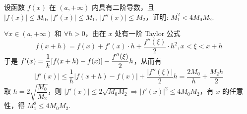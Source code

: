 \begin{example}
    设函数 $f(x)$ 在 $(a,+\infty)$ 内具有二阶导数，且 $|f(x)|\leqslant M_0,~|f'(x)|\leqslant M_1,~|f''(x)|\leqslant M_2$，证明: $M_1^2< 4M_0M_2.$
\end{example}
\begin{solution}
    $\forall x\in(a,+\infty)$ 和 $\forall h>0$，由在 $x$ 处有一阶 Taylor 公式 $$f(x+h)=f(x)+f'(x)\cdot h+\dfrac{f''(\xi)}{2}\cdot h^2,x<\xi<x+h$$
    于是 $f'(x)=\dfrac{1}{h}\qty[f(x+h)-f(x)]-\dfrac{f''(\xi)}{2}h$，从而有 $$|f'(x)|\leqslant \dfrac{1}{h}|f(x+h)-f(x)|+\dfrac{|f''(\xi)|}{2}h=\dfrac{2M_0}{h}+\dfrac{M_2h}{2}$$
    取 $h=2\sqrt{\dfrac{M_0}{M_2}}$，则 $|f'(x)|\leqslant 2\sqrt{M_0M_2}\Rightarrow |f'(x)|^2\leqslant 4M_0M_2$，有 $x$ 的任意性，得 $M_1^2\leqslant 4M_0M_2.$
\end{solution}

